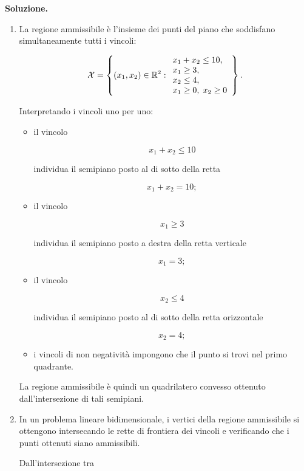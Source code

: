 \noindent
\textbf{Soluzione.}

\begin{enumerate}

\item La regione ammissibile \`e l'insieme dei punti del piano che soddisfano
simultaneamente tutti i vincoli:

\[
\mathcal{X}
=
\left\{
(x_1,x_2)\in\mathbb{R}^2:
\begin{array}{l}
x_1+x_2\leq10,\\
x_1\geq3,\\
x_2\leq4,\\
x_1\geq0,\;x_2\geq0
\end{array}
\right\}.
\]

Interpretando i vincoli uno per uno:

\begin{itemize}

\item il vincolo

\[
x_1+x_2\leq10
\]

individua il semipiano posto al di sotto della retta

\[
x_1+x_2=10;
\]

\item il vincolo

\[
x_1\geq3
\]

individua il semipiano posto a destra della retta verticale

\[
x_1=3;
\]

\item il vincolo

\[
x_2\leq4
\]

individua il semipiano posto al di sotto della retta orizzontale

\[
x_2=4;
\]

\item i vincoli di non negativit\`a impongono che il punto si trovi nel primo
quadrante.

\end{itemize}

La regione ammissibile \`e quindi un quadrilatero convesso ottenuto
dall'intersezione di tali semipiani.

\item In un problema lineare bidimensionale, i vertici della regione
ammissibile si ottengono intersecando le rette di frontiera dei vincoli e
verificando che i punti ottenuti siano ammissibili.

Dall'intersezione tra


\end{enumerate}
